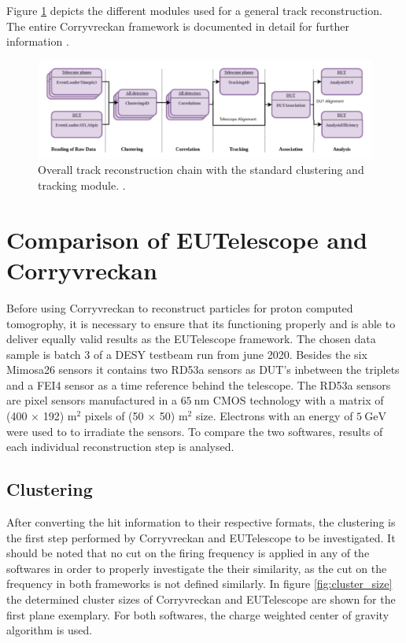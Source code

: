 Figure \ref{fig:corry_track_reco} depicts
the different modules used for a general track reconstruction. The entire Corryvreckan framework is documented in detail for further information \cite{corry_manual}.

\begin{figure}
  \centering
  \includegraphics[height=0.3\textwidth]{images/corry.png}
  \caption{Overall track reconstruction chain with the standard clustering and tracking module. \cite{corry_track_reco}.}
  \label{fig:corry_track_reco}
\end{figure}

\chapter{Comparison of EUTelescope and Corryvreckan}\label{make}
Before using Corryvreckan to reconstruct particles for proton computed tomogrophy, it is necessary to ensure that its functioning properly
and is able to deliver equally valid results as the EUTelescope framework.
The chosen data sample is batch 3 of a DESY testbeam run from june 2020. Besides the six Mimosa26 sensors it contains two RD53a sensors
as DUT's inbetween the triplets and a FEI4 sensor as a time reference behind the telescope. The RD53a sensors are pixel sensors
manufactured in a $\SI{65}{\nano\meter}$ CMOS technology with a matrix of (400 $\times$ 192) \textmu m$^2$ pixels of
(50 $\times$ 50) \textmu m$^2$ size. Electrons with an energy of $\SI{5}{\GeV}$ were used to to irradiate the sensors.
To compare the two softwares, results of each individual
reconstruction step is analysed. \\

\section{Clustering}
After converting the hit information to their respective formats, the clustering is the first step performed by Corryvreckan and EUTelescope
to be investigated.
It should be noted that no cut on the firing frequency is applied in any of the softwares in order to properly investigate
the their similarity, as the cut on the frequency in both frameworks is not defined similarly.
In figure \ref{fig:cluster_size} the determined cluster sizes of Corryvreckan and EUTelescope are shown for the first plane exemplary.
For both softwares, the charge weighted center of gravity algorithm is used.

